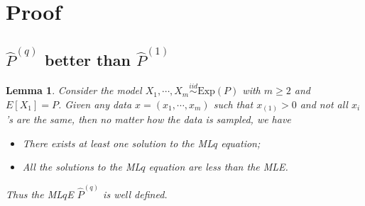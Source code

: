 \documentclass[a4paper]{article}
\newtheorem{lemma}[fact]{Lemma}
\begin{document}
\newpage

\section{Proof}

\subsection{$\hat{P}^{(q)}$ better than $\hat{P}^{(1)}$}

\begin{lemma}
\label{lemma:LqlMLE}
Consider the model $X_1, \cdots, X_m \stackrel{iid}{\sim} \mathrm{Exp}(P)$ with $m \ge 2$ and $E[X_1] = P$. Given any data $x = (x_1, \cdots, x_m)$ such that $x_{(1)} > 0$ and not all $x_i$'s are the same, then no matter how the data is sampled, we have
\begin{itemize}
\item There exists at least one solution to the ML$q$ equation;
\item All the solutions to the ML$q$ equation are less than the MLE.
\end{itemize}
Thus the ML$q$E $\hat{P}^{(q)}$ is well defined.
\end{lemma}
\end{document}
